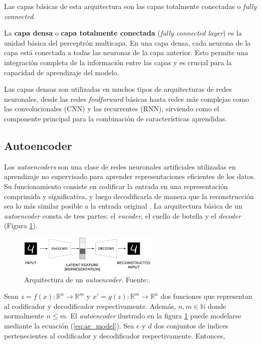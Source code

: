 Las capas básicas de esta arquitectura son las capas totalmente conectadas o \textit{fully connected}. 


La \textbf{capa densa} o \textbf{capa totalmente conectada} (\textit{fully connected layer}) es la unidad básica del perceptrón multicapa. En una capa densa, cada neurona de la capa está conectada a todas las neuronas de la capa anterior. Esto permite una integración completa de la información entre las capas y es crucial para la capacidad de aprendizaje del modelo.

Las capas densas son utilizadas en muchos tipos de arquitecturas de redes neuronales, desde las redes \textit{feedforward} básicas hasta redes más complejas como las convolucionales (CNN) y las recurrentes (RNN), sirviendo como el componente principal para la combinación de características aprendidas.



\subsection{Autoencoder} \label{sec:ae}

Los \textit{autoencoders} son una clase de redes neuronales artificiales utilizadas en aprendizaje no supervisado para aprender representaciones eficientes de los datos. Su funcionamiento consiste en codificar la entrada en una representación comprimida y significativa, y luego decodificarla de manera que la reconstrucción sea lo más similar posible a la entrada original \citep{lopes2022effective}. La arquitectura básica de un \textit{autoencoder} consta de tres partes: el \textit{encoder}, el cuello de botella y el \textit{decoder} (Figura \ref{fig:AE_architecture}). 


\begin{figure}[h]
    \centering
    \includegraphics[width=0.6\textwidth]{img/AE4.png}
    \caption{Arquitectura de un \textit{autoencoder}. Fuente:\citep{autoencoderImage}.}
    \label{fig:AE_architecture}
\end{figure}




Sean $z = f(x): \mathbb{R}^n \to \mathbb{R}^m$ y $x' = g(z): \mathbb{R}^m \to \mathbb{R}^n$ dos funciones que representan al codificador y decodificador respectivamente. Además, $n,m \in \mathbb{N}$ donde normalmente $n \leq m$. El \textit{autoencoder} ilustrado en la figura \ref{fig:AE_architecture} puede modelarse mediante la ecuación (\ref{eq:ae_model}). Sea $e$ y $d$ dos conjuntos de índices pertenecientes al codificador y decodificador respectivamente. Entonces,

